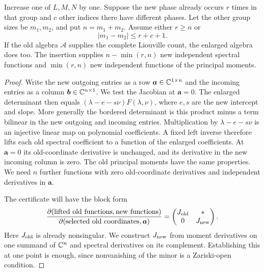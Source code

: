 \begin{lemma}\label{lem:canonical-insertion}
Increase one of $L,M,N$ by one. Suppose the new phase already
occurs $r$ times in that group and $c$ other indices there have
different phases. Let the other group sizes be $m_1,m_2$, and put
$n=m_1+m_2$. Assume either $r\geq n$ or
\begin{equation}\label{eq:canonical-insertion-condition}
 |m_1-m_2|\leq r+c+1.
\end{equation}
If the old algebra $\mathcal A$ supplies the complete Liouville count,
the enlarged algebra does too. The insertion supplies
$n-\min(r,n)$ new independent spectral functions and $\min(r,n)$
new independent functions of the principal moments.
\end{lemma}
\begin{proof}
Write the new outgoing entries as a row $\boldsymbol a\in\mathbb C^{1\times n}$ and
the incoming entries as a column $\boldsymbol b\in\mathbb C^{n\times1}$.
We test the Jacobian at $\boldsymbol a=0$. The enlarged determinant then equals
$(\lambda-e-s\nu)F(\lambda,\nu)$, where $e,s$ are the new intercept
and slope. More generally the bordered determinant is this product
minus a term bilinear in the new outgoing and incoming entries.
Multiplication by $\lambda-e-s\nu$ is an injective linear map on
polynomial coefficients. A fixed left inverse therefore lifts each
old spectral coefficient to a function of the enlarged coefficients.
At $\boldsymbol a=0$ its old-coordinate derivative is unchanged,
and its derivative in the new incoming column is zero. The old
principal moments have the same properties. We need $n$ further
functions with zero old-coordinate
derivatives and independent derivatives in $\boldsymbol a$.

The certificate will have the block form
\[
 \frac{\partial(\text{lifted old functions},\text{new functions})}
      {\partial(\text{selected old coordinates},\boldsymbol a)}
 =\begin{pmatrix}J_{\rm old}&*\\0&J_{\rm new}\end{pmatrix}.
\]
Here $J_{\rm old}$ is already nonsingular. We construct $J_{\rm new}$
from moment derivatives on one summand of $\mathbb C^n$ and spectral
derivatives on its complement. Establishing this at one point is
enough, since nonvanishing of the minor is a Zariski-open condition.


\end{proof}
